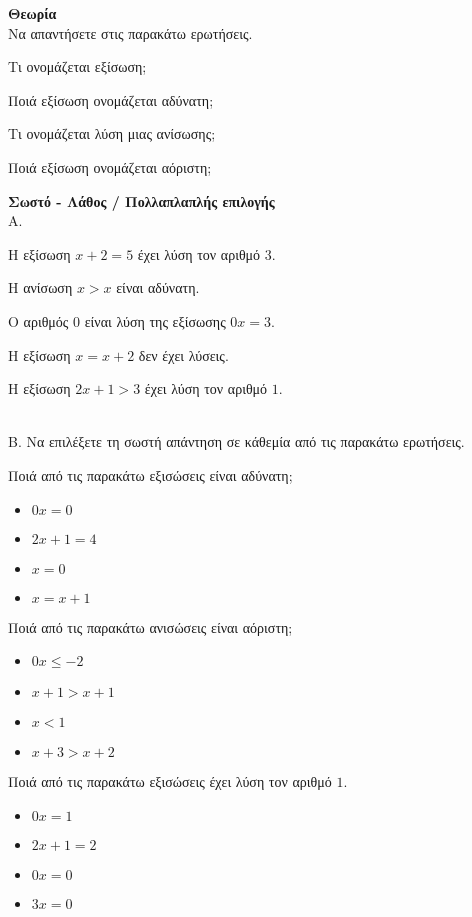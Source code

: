\documentclass[ektypwsh]{diag-xelatex}
\begin{document}
\thewria
\begin{thema}
\item \textbf{Θεωρία}\\
Να απαντήσετε στις παρακάτω ερωτήσεις.
\begin{rlist}
\item Τι ονομάζεται εξίσωση;
\item Ποιά εξίσωση ονομάζεται αδύνατη;
\item Τι ονομάζεται λύση μιας ανίσωσης;
\item Ποιά εξίσωση ονομάζεται αόριστη;
\end{rlist}
\item \textbf{Σωστό - Λάθος / Πολλαπλαπλής επιλογής}\\
Α. \swstolathosd
\begin{rlist}
\item Η εξίσωση $ x+2=5 $ έχει λύση τον αριθμό $ 3 $.
\item Η ανίσωση $ x>x $ είναι αδύνατη.
\item Ο αριθμός $ 0 $ είναι λύση της εξίσωσης $ 0x=3 $.
\item Η εξίσωση $ x=x+2 $ δεν έχει λύσεις.
\item Η εξίσωση $ 2x+1>3 $ έχει λύση τον αριθμό $ 1 $.
\end{rlist}\\
Β. Να επιλέξετε τη σωστή απάντηση σε κάθεμία από τις παρακάτω ερωτήσεις.
\begin{rlist}
\item Ποιά από τις παρακάτω εξισώσεις είναι αδύνατη;
\begin{multicols}{4}
\begin{itemize}
\item $ 0x=0 $
\item $ 2x+1=4 $
\item $ x=0 $
\item $ x=x+1 $
\end{itemize}
\end{multicols}
\item Ποιά από τις παρακάτω ανισώσεις είναι αόριστη;
\begin{multicols}{4}
\begin{itemize}
\item $ 0x\leq-2 $
\item $ x+1>x+1 $
\item $ x<1 $
\item $ x+3>x+2 $
\end{itemize}
\end{multicols}
\item Ποιά από τις παρακάτω εξισώσεις έχει λύση τον αριθμό $ 1 $.
\begin{multicols}{4}
\begin{itemize}
\item $ 0x=1 $
\item $ 2x+1=2 $
\item $ 0x=0 $
\item $ 3x=0 $
\end{itemize}
\end{multicols}
\end{rlist}
\end{thema}
\end{document}
